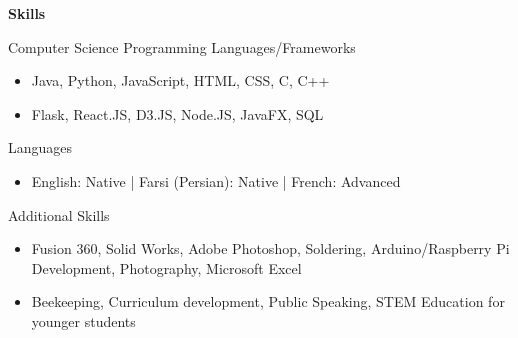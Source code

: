 \documentclass{article}
\begin{document}
\begin{spacing}{1.15}
\noindent\large{\bfseries Skills \vspace*{0.2cm}}

\normalsize{
\noindent Computer Science Programming Languages/Frameworks
}
\small{
\begin{itemize}[noitemsep]
    \item Java, Python, JavaScript, HTML, CSS, C, C++
    \item Flask, React.JS, D3.JS, Node.JS,  JavaFX, SQL
\end{itemize}
\vspace*{0.15cm}
}

\normalsize{
\noindent Languages
}
\small{
\begin{itemize}[noitemsep]
    \item English: Native | Farsi (Persian): Native | French: Advanced
\end{itemize}
\vspace*{0.15cm}
}

\normalsize{
\noindent Additional Skills
}
\small{
\begin{itemize}[noitemsep]
    \item Fusion 360, Solid Works, Adobe Photoshop, Soldering, Arduino/Raspberry Pi Development, Photography, Microsoft Excel
    \item Beekeeping, Curriculum development, Public Speaking, STEM Education for younger students
\end{itemize}
\vspace*{0.2cm}
}


\end{spacing}
\end{document}
